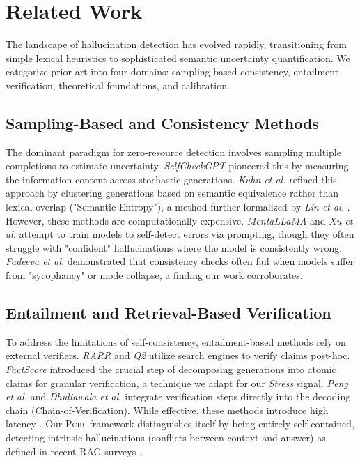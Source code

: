 \documentclass[11pt,letterpaper]{article}
\newcommand{\modelname}{\textsc{Pcib}}
\begin{document}
\section{Related Work}

The landscape of hallucination detection has evolved rapidly, transitioning from simple lexical heuristics to sophisticated semantic uncertainty quantification. We categorize prior art into four domains: sampling-based consistency, entailment verification, theoretical foundations, and calibration.

\subsection{Sampling-Based and Consistency Methods}
The dominant paradigm for zero-resource detection involves sampling multiple completions to estimate uncertainty. \textit{SelfCheckGPT} \cite{manakul2023selfcheckgpt} pioneered this by measuring the information content across stochastic generations. \textit{Kuhn et al.} \cite{kuhn2023semantic} refined this approach by clustering generations based on semantic equivalence rather than lexical overlap ("Semantic Entropy"), a method further formalized by \textit{Lin et al.} \cite{lin2023generating}. However, these methods are computationally expensive. \textit{MentaLLaMA} \cite{ji2024mentallama} and \textit{Xu et al.} \cite{xu2024hallucination} attempt to train models to self-detect errors via prompting, though they often struggle with "confident" hallucinations where the model is consistently wrong. \textit{Fadeeva et al.} \cite{fadeeva2023hallucination} demonstrated that consistency checks often fail when models suffer from "sycophancy" or mode collapse, a finding our work corroborates.

\subsection{Entailment and Retrieval-Based Verification}
To address the limitations of self-consistency, entailment-based methods rely on external verifiers. \textit{RARR} \cite{gao2023rarr} and \textit{Q2} \cite{honovich2021qags} utilize search engines to verify claims post-hoc. \textit{FactScore} \cite{min2023factscore} introduced the crucial step of decomposing generations into atomic claims for granular verification, a technique we adapt for our \textit{Stress} signal. \textit{Peng et al.} \cite{peng2023check} and \textit{Dhuliawala et al.} \cite{dhuliawala2023chain} integrate verification steps directly into the decoding chain (Chain-of-Verification). While effective, these methods introduce high latency \cite{chen2024benchmarking}. Our \modelname\ framework distinguishes itself by being entirely self-contained, detecting intrinsic hallucinations (conflicts between context and answer) as defined in recent RAG surveys \cite{huang2023survey, liu2023trustworthy}.
\end{document}
